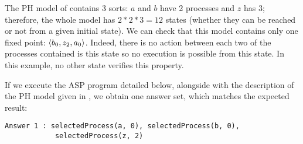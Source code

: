 \begin{example}
The PH model of  contains 3 sorts:
$a$ and $b$ have 2 processes and $z$ has 3; therefore, the whole model has $2*2*3 = 12$ states (whether they can be reached or not from a given initial state).
We can check that this model contains only one fixed point: $\mbox{$\langle b_0, z_2, a_0 \rangle$}$.
Indeed, there is no action between each two of the processes contained is this state so no execution is possible from this state. 
In this example, no other state verifies this property.

If we execute the ASP program detailed below,
alongside with the description of the PH model given in ,
we obtain one answer set, which matches the expected result:
\begin{lstlisting}[numbers=none]
Answer 1 : selectedProcess(a, 0), selectedProcess(b, 0),
            selectedProcess(z, 2)
\end{lstlisting}
\end{example}